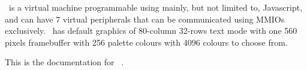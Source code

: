 \thismachine\ is a virtual machine programmable using mainly, but not limited to, Javascript, and can have 7 virtual peripherals that can be communicated using MMIOs exclusively. \thismachine\ has default graphics of 80-column 32-rows text mode with one 560 pixels framebuffer with 256 palette colours with 4096 colours to choose from.

This is the documentation for \thismachine\ \tsvmver.

